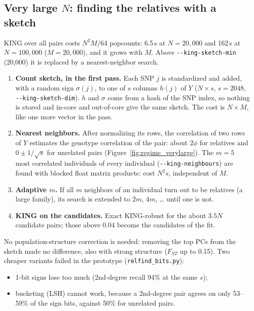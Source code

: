 \documentclass[11pt,a4paper]{article}
\newcommand{\opt}[1]{\texttt{-{}-#1}}
\begin{document}
\subsection{Very large $N$: finding the relatives with a sketch}
\label{sec:sketch}

KING over all pairs costs $N^2M/64$ popcounts: 6.5\,s at $N=20{,}000$ and
162\,s at $N=100{,}000$ ($M=20{,}000$), and it grows with $M$. Above
\opt{king-sketch-min} (20{,}000) it is replaced by a nearest-neighbor search.
\begin{enumerate}
  \item \textbf{Count sketch, in the first pass.} Each SNP $j$ is
    standardized and added, with a random sign $\sigma(j)$, to one of $s$
    columns $h(j)$ of $Y$ ($N\times s$, $s=2048$, \opt{king-sketch-dim}).
    $h$ and $\sigma$ come from a hash of the SNP index, so nothing is stored
    and in-core and out-of-core give the same sketch. The cost is $N\times M$,
    like one more vector in the pass.
  \item \textbf{Nearest neighbors.} After normalizing its rows, the
    correlation of two rows of $Y$ estimates the genotype correlation of the
    pair: about $2\phi$ for relatives and $0\pm1/\sqrt s$ for unrelated pairs
    (Figure~\ref{fig:regime_verylarge}). The $m=5$ most correlated individuals
    of every individual (\opt{king-neighbours}) are found with blocked float
    matrix products: cost $N^2s$, independent of $M$.
  \item \textbf{Adaptive $m$.} If all $m$ neighbors of an individual turn out
    to be relatives (a large family), its search is extended to $2m$, $4m$,
    \dots{} until one is not.
  \item \textbf{KING on the candidates.} Exact KING-robust for the about
    $3.5N$ candidate pairs; those above 0.04 become the candidates of the fit.
\end{enumerate}
No population-structure correction is needed: removing the top PCs from the
sketch made no difference, also with strong structure ($F_{ST}$ up to 0.15).
Two cheaper variants failed in the prototype (\texttt{relfind\_bits.py}):
\begin{itemize}
  \item 1-bit signs lose too much (2nd-degree recall 94\% at the same $s$);
  \item bucketing (LSH) cannot work, because a 2nd-degree pair agrees on only
    53--59\% of the sign bits, against 50\% for unrelated pairs.
\end{itemize}
\end{document}
